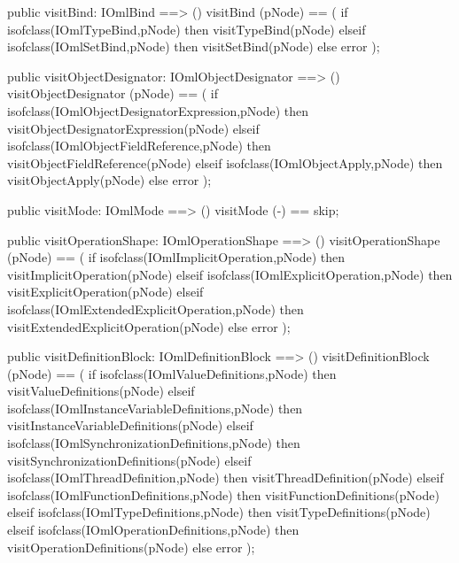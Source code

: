 \begin{vdm_al}
  public visitBind: IOmlBind ==> ()
  visitBind (pNode) ==
    ( if isofclass(IOmlTypeBind,pNode) then visitTypeBind(pNode)
      elseif isofclass(IOmlSetBind,pNode) then visitSetBind(pNode)
      else error );

  public visitObjectDesignator: IOmlObjectDesignator ==> ()
  visitObjectDesignator (pNode) ==
    ( if isofclass(IOmlObjectDesignatorExpression,pNode) then visitObjectDesignatorExpression(pNode)
      elseif isofclass(IOmlObjectFieldReference,pNode) then visitObjectFieldReference(pNode)
      elseif isofclass(IOmlObjectApply,pNode) then visitObjectApply(pNode)
      else error );

  public visitMode: IOmlMode ==> ()
  visitMode (-) == skip;

  public visitOperationShape: IOmlOperationShape ==> ()
  visitOperationShape (pNode) ==
    ( if isofclass(IOmlImplicitOperation,pNode) then visitImplicitOperation(pNode)
      elseif isofclass(IOmlExplicitOperation,pNode) then visitExplicitOperation(pNode)
      elseif isofclass(IOmlExtendedExplicitOperation,pNode) then visitExtendedExplicitOperation(pNode)
      else error );

  public visitDefinitionBlock: IOmlDefinitionBlock ==> ()
  visitDefinitionBlock (pNode) ==
    ( if isofclass(IOmlValueDefinitions,pNode) then visitValueDefinitions(pNode)
      elseif isofclass(IOmlInstanceVariableDefinitions,pNode) then visitInstanceVariableDefinitions(pNode)
      elseif isofclass(IOmlSynchronizationDefinitions,pNode) then visitSynchronizationDefinitions(pNode)
      elseif isofclass(IOmlThreadDefinition,pNode) then visitThreadDefinition(pNode)
      elseif isofclass(IOmlFunctionDefinitions,pNode) then visitFunctionDefinitions(pNode)
      elseif isofclass(IOmlTypeDefinitions,pNode) then visitTypeDefinitions(pNode)
      elseif isofclass(IOmlOperationDefinitions,pNode) then visitOperationDefinitions(pNode)
      else error );


\end{vdm_al}
